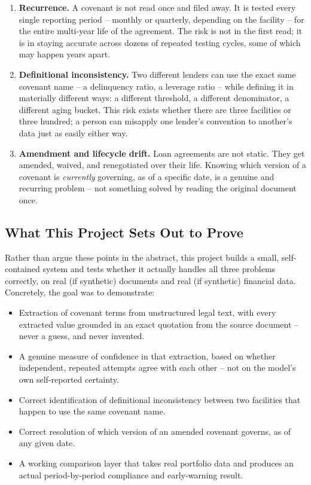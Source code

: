 \documentclass[11pt,a4paper]{article}
\begin{document}
\begin{enumerate}[leftmargin=1.4em]
\item \textbf{Recurrence.} A covenant is not read once and filed away. It is tested every single reporting period -- monthly or quarterly, depending on the facility -- for the entire multi-year life of the agreement. The risk is not in the first read; it is in staying accurate across dozens of repeated testing cycles, some of which may happen years apart.
\item \textbf{Definitional inconsistency.} Two different lenders can use the exact same covenant name -- a delinquency ratio, a leverage ratio -- while defining it in materially different ways: a different threshold, a different denominator, a different aging bucket. This risk exists whether there are three facilities or three hundred; a person can misapply one lender's convention to another's data just as easily either way.
\item \textbf{Amendment and lifecycle drift.} Loan agreements are not static. They get amended, waived, and renegotiated over their life. Knowing which version of a covenant is \emph{currently} governing, as of a specific date, is a genuine and recurring problem -- not something solved by reading the original document once.
\end{enumerate}

\subsection{What This Project Sets Out to Prove}

Rather than argue these points in the abstract, this project builds a small, self-contained system and tests whether it actually handles all three problems correctly, on real (if synthetic) documents and real (if synthetic) financial data. Concretely, the goal was to demonstrate:

\begin{itemize}[leftmargin=1.4em]
\item Extraction of covenant terms from unstructured legal text, with every extracted value grounded in an exact quotation from the source document -- never a guess, and never invented.
\item A genuine measure of confidence in that extraction, based on whether independent, repeated attempts agree with each other -- not on the model's own self-reported certainty.
\item Correct identification of definitional inconsistency between two facilities that happen to use the same covenant name.
\item Correct resolution of which version of an amended covenant governs, as of any given date.
\item A working comparison layer that takes real portfolio data and produces an actual period-by-period compliance and early-warning result.
\end{itemize}
\end{document}
